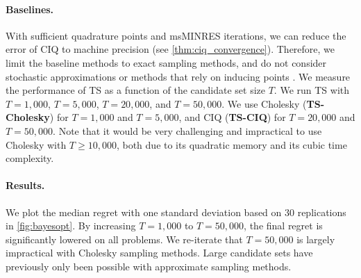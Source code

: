 \paragraph{Baselines.}
With sufficient quadrature points and msMINRES iterations, we can reduce the error of CIQ to machine precision (see \cref{thm:ciq_convergence}).
Therefore, we limit the baseline methods to exact sampling methods, and do not consider stochastic approximations \cite{rahimi2008random} or methods that rely on inducing points \cite{wilson2020efficiently}.
We measure the performance of TS as a function of the candidate set size $T$.
We run TS with $T=1,\!000$, $T=5,\!000$, $T=20,\!000$, and $T=50,\!000$.
We use Cholesky ({\bf TS-Cholesky}) for $T=1,\!000$ and $T=5,\!000$, and CIQ ({\bf TS-CIQ}) for $T=20,\!000$ and $T=50,\!000$.
Note that it would be very challenging and impractical to use Cholesky with $T \geq 10,\!000$, both due to its quadratic memory and its cubic time complexity.

\paragraph{Results.}
We plot the median regret with one standard deviation based on 30 replications in \cref{fig:bayesopt}.
By increasing $T=1,\!000$ to $T=50,\!000$, the final regret is significantly lowered on all problems.
We re-iterate that $T=50,\!000$ is largely impractical with Cholesky sampling methods.
Large candidate sets have previously only been possible with approximate sampling methods.
